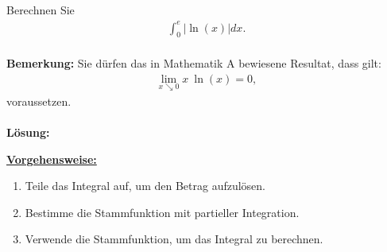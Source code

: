 \subsection*{}
Berechnen Sie 
\begin{align*}
\int_0^e |\ln(x)| dx.
\end{align*}
\ \\
\textbf{Bemerkung:} Sie dürfen das in Mathematik A bewiesene Resultat, dass gilt:
\begin{align*}
\lim \limits_{x \searrow 0} x \ \ln(x) = 0,
\end{align*}
voraussetzen.\\
\\
\textbf{Lösung:}
\begin{mdframed}
\underline{\textbf{Vorgehensweise:}}
\begin{enumerate}
\item Teile das Integral auf, um den Betrag aufzulösen.
\item Bestimme die Stammfunktion mit partieller Integration.
\item Verwende die Stammfunktion, um das Integral zu berechnen.
\end{enumerate}
\end{mdframed}

